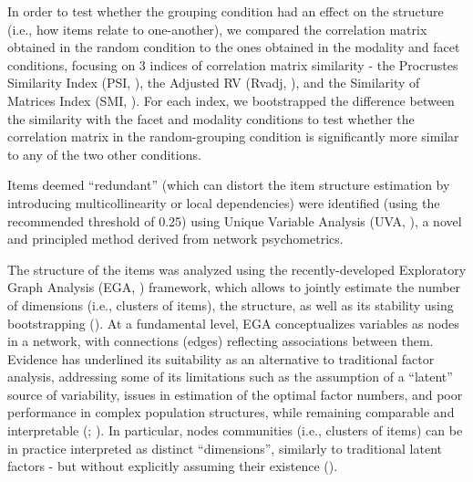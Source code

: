 \documentclass[
  jou,
  floatsintext,
  longtable,
  nolmodern,
  notxfonts,
  notimes,
  colorlinks=true,linkcolor=blue,citecolor=blue,urlcolor=blue]{apa7}
\begin{document}
In order to test whether the grouping condition had an effect on the
structure (i.e., how items relate to one-another), we compared the
correlation matrix obtained in the random condition to the ones obtained
in the modality and facet conditions, focusing on 3 indices of
correlation matrix similarity - the Procrustes Similarity Index (PSI,
), the Adjusted RV (Rvadj,
), and the
Similarity of Matrices Index (SMI,
). For each
index, we bootstrapped the difference between the similarity with the
facet and modality conditions to test whether the correlation matrix in
the random-grouping condition is significantly more similar to any of
the two other conditions.

Items deemed ``redundant'' (which can distort the item structure
estimation by introducing multicollinearity or local dependencies) were
identified (using the recommended threshold of 0.25) using Unique
Variable Analysis (UVA, ), a novel and principled method derived from network
psychometrics.

The structure of the items was analyzed using the recently-developed
Exploratory Graph Analysis (EGA, ) framework, which allows to jointly estimate
the number of dimensions (i.e., clusters of items), the structure, as
well as its stability using bootstrapping
(). At a
fundamental level, EGA conceptualizes variables as nodes in a network,
with connections (edges) reflecting associations between them. Evidence
has underlined its suitability as an alternative to traditional factor
analysis, addressing some of its limitations such as the assumption of a
``latent'' source of variability, issues in estimation of the optimal
factor numbers, and poor performance in complex population structures,
while remaining comparable and interpretable
(;
). In
particular, nodes communities (i.e., clusters of items) can be in
practice interpreted as distinct ``dimensions'', similarly to
traditional latent factors - but without explicitly assuming their
existence ().
\end{document}
